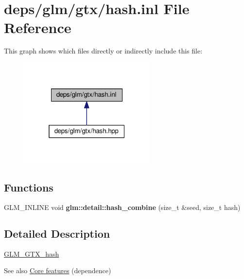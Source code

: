 \hypertarget{hash_8inl}{}\section{deps/glm/gtx/hash.inl File Reference}
\label{hash_8inl}
This graph shows which files directly or indirectly include this file\+:
\nopagebreak
\begin{figure}[H]
\begin{center}
\leavevmode
\includegraphics[width=196pt]{db/d34/hash_8inl__dep__incl}
\end{center}
\end{figure}
\subsection*{Functions}
\begin{DoxyCompactItemize}
\item 
\mbox{\label{hash_8inl_a391b3eb8d7f4662a1b31046bd69f2755}} 
G\+L\+M\+\_\+\+I\+N\+L\+I\+NE void {\bfseries glm\+::detail\+::hash\+\_\+combine} (size\+\_\+t \&seed, size\+\_\+t hash)
\end{DoxyCompactItemize}


\subsection{Detailed Description}
\hyperlink{group__gtx__hash}{G\+L\+M\+\_\+\+G\+T\+X\+\_\+hash}

\begin{DoxySeeAlso}{See also}
\hyperlink{group__core}{Core features} (dependence) 
\end{DoxySeeAlso}
